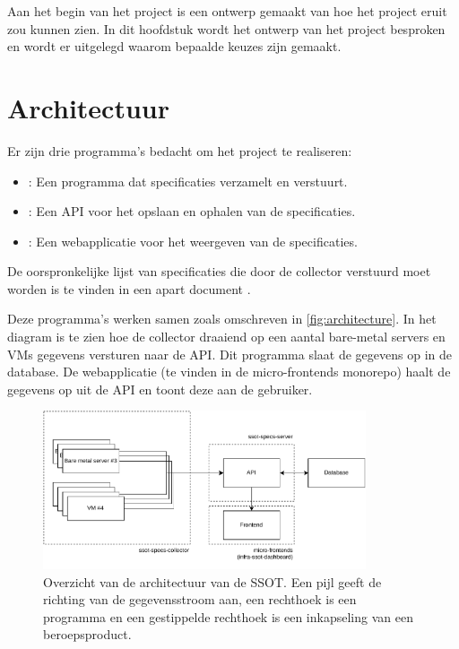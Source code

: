 \documentclass[../report.tex]{subfiles}
\begin{document}
Aan het begin van het project is een ontwerp gemaakt van hoe het project eruit zou kunnen zien. In dit hoofdstuk wordt het ontwerp van het project besproken en wordt er uitgelegd waarom bepaalde keuzes zijn gemaakt.

\section{Architectuur}

Er zijn drie programma's bedacht om het project te realiseren:

\begin{itemize}
  \item \collector{}: Een programma dat specificaties verzamelt en verstuurt.
  \item \server{}: Een \gls*{API} voor het opslaan en ophalen van de specificaties.
  \item \dashboard{}: Een webapplicatie voor het weergeven van de specificaties.
\end{itemize}

De oorspronkelijke lijst van specificaties die door de collector verstuurd moet worden is te vinden in een apart document \parencite{specificaties}.

Deze programma's werken samen zoals omschreven in \autoref{fig:architecture}. In het diagram is te zien hoe de collector draaiend op een aantal bare-metal \glspl*{server} en VMs gegevens versturen naar de \gls*{API}. Dit programma slaat de gegevens op in de database. De webapplicatie (te vinden in de micro-frontends monorepo) haalt de gegevens op uit de \gls*{API} en toont deze aan de gebruiker.

\begin{figure}
  \centering
  \includegraphics[width=0.85\textwidth]{../assets/images/drawio/architecture.pdf}
  \caption{Overzicht van de architectuur van de \gls*{SSOT}. Een pijl geeft de richting van de gegevensstroom aan, een rechthoek is een programma en een gestippelde rechthoek is een inkapseling van een beroepsproduct.}
  \label{fig:architecture}
\end{figure}
\end{document}
